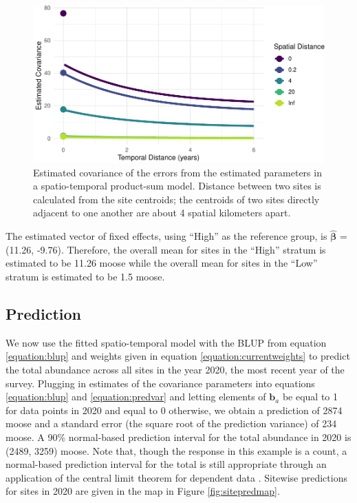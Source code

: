 \documentclass[]{interact}
\theoremstyle{plain}%
\theoremstyle{definition}
\theoremstyle{remark}
\begin{document}
\begin{figure}
\centering
\includegraphics{fpspatiotemp_manu_files/figure-latex/covplot-1.pdf}
\caption{\label{fig:covplot} Estimated covariance of the errors from the
estimated parameters in a spatio-temporal product-sum model. Distance
between two sites is calculated from the site centroids; the centroids
of two sites directly adjacent to one another are about 4 spatial
kilometers apart.}
\end{figure}

The estimated vector of fixed effects, using ``High'' as the reference
group, is \(\bm{\hat{\beta}}\) = (11.26, -9.76). Therefore, the overall
mean for sites in the ``High'' stratum is estimated to be 11.26 moose
while the overall mean for sites in the ``Low'' stratum is estimated to
be 1.5 moose.

\subsection{Prediction}

We now use the fitted spatio-temporal model with the BLUP from equation
\ref{equation:blup} and weights given in equation
\ref{equation:currentweights} to predict the total abundance across all
sites in the year 2020, the most recent year of the survey. Plugging in
estimates of the covariance parameters into equations
\ref{equation:blup} and \ref{equation:predvar} and letting elements of
\(\mathbf{b}_a\) be equal to 1 for data points in 2020 and equal to 0
otherwise, we obtain a prediction of 2874 moose and a standard error
(the square root of the prediction variance) of 234 moose. A 90\%
normal-based prediction interval for the total abundance in 2020 is
(2489, 3259) moose. Note that, though the response in this example is a
count, a normal-based prediction interval for the total is still
appropriate through an application of the central limit theorem for
dependent data \citep{smith1980central}. Sitewise predictions for sites
in 2020 are given in the map in Figure \ref{fig:sitepredmap}.
\end{document}
